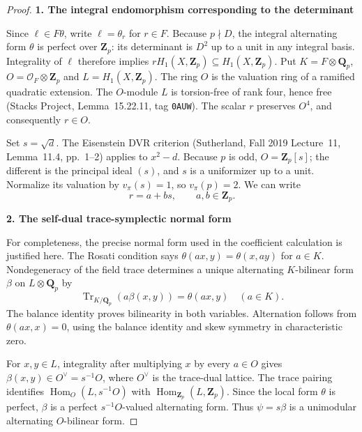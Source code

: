 \begin{proof}
\par\medskip\noindent\textbf{1. The integral endomorphism corresponding to the determinant}\quad 

Since \(\ell\in F\theta\), write \(\ell=\theta_r\) for \(r\in F\). Because \(p\nmid D\), the integral alternating form \(\theta\) is perfect over \(\mathbf Z_p\): its determinant is \(D^2\) up to a unit in any integral basis. Integrality of \(\ell\) therefore implies \(rH_1(X,\mathbf Z_p)\subseteq H_1(X,\mathbf Z_p)\). Put \(K=F\otimes\mathbf Q_p\), \(O=\mathcal O_F\otimes\mathbf Z_p\) and \(L=H_1(X,\mathbf Z_p)\). The ring \(O\) is the valuation ring of a ramified quadratic extension. The \(O\)-module \(L\) is torsion-free of rank four, hence free (Stacks Project, Lemma~15.22.11, tag \texttt{0AUW}). The scalar \(r\) preserves \(O^4\), and consequently \(r\in O\).

Set \(s=\sqrt d\). The Eisenstein DVR criterion (Sutherland, Fall 2019 Lecture~11, Lemma~11.4, pp.~1--2) applies to \(x^2-d\). Because \(p\) is odd, \(O=\mathbf Z_p[s]\); the different is the principal ideal \((s)\), and \(s\) is a uniformizer up to a unit. Normalize its valuation by \(v_\pi(s)=1\), so \(v_\pi(p)=2\). We can write \[
 r=a+bs,\qquad a,b\in\mathbf Z_p.
 \tag{S33.5}
\]

\par\medskip\noindent\textbf{2. The self-dual trace-symplectic normal form}\quad 

For completeness, the precise normal form used in the coefficient calculation is justified here. The Rosati condition says \(\theta(ax,y)=\theta(x,ay)\) for \(a\in K\). Nondegeneracy of the field trace determines a unique alternating \(K\)-bilinear form \(\beta\) on \(L\otimes\mathbf Q_p\) by \[
 \operatorname{Tr}_{K/\mathbf Q_p}(a\beta(x,y))=\theta(ax,y)
 \quad(a\in K).
\] The balance identity proves bilinearity in both variables. Alternation follows from \(\theta(ax,x)=0\), using the balance identity and skew symmetry in characteristic zero.

For \(x,y\in L\), integrality after multiplying \(x\) by every \(a\in O\) gives \(\beta(x,y)\in O^\vee=s^{-1}O\), where \(O^\vee\) is the trace-dual lattice. The trace pairing identifies \(\operatorname{Hom}_O(L,s^{-1}O)\) with \(\operatorname{Hom}_{\mathbf Z_p}(L,\mathbf Z_p)\). Since the local form \(\theta\) is perfect, \(\beta\) is a perfect \(s^{-1}O\)-valued alternating form. Thus \(\psi=s\beta\) is a unimodular alternating \(O\)-bilinear form.


\end{proof}
